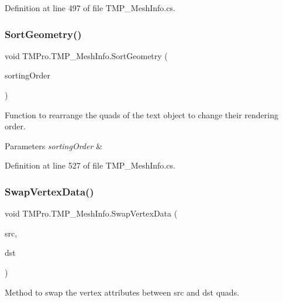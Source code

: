 Definition at line 497 of file T\+M\+P\+\_\+\+Mesh\+Info.\+cs.

\mbox{\label{struct_t_m_pro_1_1_t_m_p___mesh_info_af12a00628b4e8a24470a6f4656fee685}} 
\subsubsection{\texorpdfstring{SortGeometry()}{SortGeometry()}\hspace{0.1cm}{\footnotesize\ttfamily [2/2]}}
{\footnotesize\ttfamily void T\+M\+Pro.\+T\+M\+P\+\_\+\+Mesh\+Info.\+Sort\+Geometry (\begin{DoxyParamCaption}\item[{I\+List$<$ int $>$}]{sorting\+Order }\end{DoxyParamCaption})}



Function to rearrange the quads of the text object to change their rendering order. 


\begin{DoxyParams}{Parameters}
{\em sorting\+Order} & \\
\hline
\end{DoxyParams}


Definition at line 527 of file T\+M\+P\+\_\+\+Mesh\+Info.\+cs.

\mbox{\label{struct_t_m_pro_1_1_t_m_p___mesh_info_aea0d76fdcacdb531d31b168575444c2a}} 
\subsubsection{\texorpdfstring{SwapVertexData()}{SwapVertexData()}}
{\footnotesize\ttfamily void T\+M\+Pro.\+T\+M\+P\+\_\+\+Mesh\+Info.\+Swap\+Vertex\+Data (\begin{DoxyParamCaption}\item[{int}]{src,  }\item[{int}]{dst }\end{DoxyParamCaption})}



Method to swap the vertex attributes between src and dst quads. 


